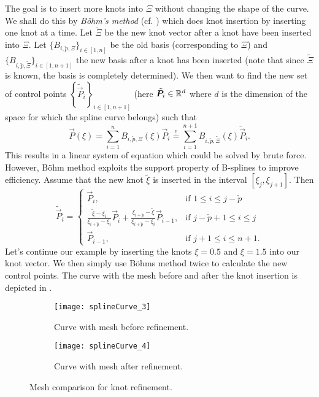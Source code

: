 The goal is to insert more knots into $\Xi$ without changing the shape of the curve. We shall do this by \textit{B\"{o}hm's method} (cf. \cite{Lyche2008smd}) which does knot insertion by inserting one knot at a time. Let $\tilde{\Xi}$ be the new knot vector after a knot have been inserted into $\Xi$. Let $\{B_{i,\check{p},\Xi}\}_{i\in [1,n]}$ be the old basis (corresponding to $\Xi$) and $\{B_{i,\check{p},\tilde{\Xi}}\}_{i\in [1,n+1]}$ the new basis after a knot has been inserted (note that since $\tilde{\Xi}$ is known, the basis is completely determined). We then want to find the new set of control points $\left\{\tilde{\vec{P}}_i\right\}_{i\in[1,n+1]}$ (here $\tilde{\vec{P}}_i\in\R^d$ where $d$ is the dimension of the space for which the spline curve belongs) such that
\begin{equation*}
	\vec{P}(\xi) = \sum_{i=1}^n B_{i,\check{p},\Xi}(\xi) \vec{P}_i \overset{!}{=} \sum_{i=1}^{n+1} B_{i,\check{p},\tilde{\Xi}}(\xi) \tilde{\vec{P}}_i.
\end{equation*}
This results in a linear system of equation which could be solved by brute force. However, B\"{o}hm method exploits the support property of B-splines to improve efficiency. Assume that the new knot $\tilde{\xi}$ is inserted in the interval $[\xi_j,\xi_{j+1}]$. Then 
\begin{equation*}
	\tilde{\vec{P}}_i = 
	\begin{cases}
		\vec{P}_i, & \text{if } 1\leq i\leq j-\check{p}\\
		\frac{\tilde{\xi}-\xi_i}{\xi_{i+\check{p}}-\xi_i} \vec{P}_i + \frac{\xi_{i+\check{p}} - \tilde{\xi}}{\xi_{i+\check{p}}-\xi_i} \vec{P}_{i-1}, & \text{if } j-\check{p}+1\leq i\leq j\\
		\vec{P}_{i-1}, & \text{if } j+1\leq i\leq n+1.
	\end{cases}
\end{equation*}
Let's continue our example by inserting the knots $\xi = 0.5$ and $\xi = 1.5$ into our knot vector. We then simply use B\"{o}hms method twice to calculate the new control points. The curve with the mesh before and after the knot insertion is depicted in . 
\begin{figure}
        \centering        
        \begin{subfigure}{0.49\textwidth}
       		\centering
			\texttt{[image: splineCurve\_3]}
            \caption{Curve with mesh before refinement.}
        \end{subfigure}%
        \hspace*{0.02\textwidth}%
        \begin{subfigure}{0.49\textwidth}
       		\centering
			\texttt{[image: splineCurve\_4]}
        	\caption{Curve with mesh after refinement.}
        \end{subfigure}
        \caption{Mesh comparison for knot refinement.}\label{Fig:splineCurveRefined}
\end{figure}
